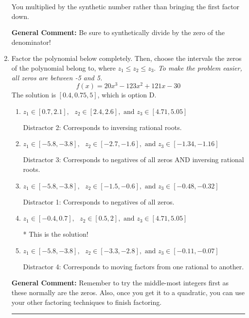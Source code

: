 \documentclass{extbook}[14pt]
\newcommand{\litem}[1]{\item #1

\rule{\textwidth}{0.4pt}}
\begin{document}
\begin{enumerate}
{\begin{enumerate}[label=\Alph*.]
 You multiplied by the synthetic number rather than bringing the first factor down.
\end{enumerate}

\textbf{General Comment:} Be sure to synthetically divide by the zero of the denominator!
}
\litem{
Factor the polynomial below completely. Then, choose the intervals the zeros of the polynomial belong to, where $z_1 \leq z_2 \leq z_3$. \textit{To make the problem easier, all zeros are between -5 and 5.}
\[ f(x) = 20x^{3} -123 x^{2} +121 x -30 \]The solution is \( [0.4, 0.75, 5] \), which is option D.\begin{enumerate}[label=\Alph*.]
\item \( z_1 \in [0.7, 2.1], \text{   }  z_2 \in [2.4, 2.6], \text{   and   } z_3 \in [4.71, 5.05] \)

 Distractor 2: Corresponds to inversing rational roots.
\item \( z_1 \in [-5.8, -3.8], \text{   }  z_2 \in [-2.7, -1.6], \text{   and   } z_3 \in [-1.34, -1.16] \)

 Distractor 3: Corresponds to negatives of all zeros AND inversing rational roots.
\item \( z_1 \in [-5.8, -3.8], \text{   }  z_2 \in [-1.5, -0.6], \text{   and   } z_3 \in [-0.48, -0.32] \)

 Distractor 1: Corresponds to negatives of all zeros.
\item \( z_1 \in [-0.4, 0.7], \text{   }  z_2 \in [0.5, 2], \text{   and   } z_3 \in [4.71, 5.05] \)

* This is the solution!
\item \( z_1 \in [-5.8, -3.8], \text{   }  z_2 \in [-3.3, -2.8], \text{   and   } z_3 \in [-0.11, -0.07] \)

 Distractor 4: Corresponds to moving factors from one rational to another.
\end{enumerate}

\textbf{General Comment:} Remember to try the middle-most integers first as these normally are the zeros. Also, once you get it to a quadratic, you can use your other factoring techniques to finish factoring.
}
\end{enumerate}
\end{document}
